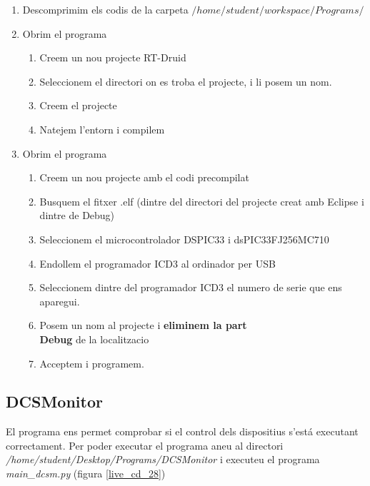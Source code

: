 \begin{enumerate}
	\item Descomprimim els codis de la carpeta $/home/student/workspace/Programs/$
	\item Obrim el programa \Eclipse
	\begin{enumerate}
		\item Creem un nou projecte RT-Druid
		\item Seleccionem el directori on es troba el projecte, i li posem un nom.
		\item Creem el projecte
		\item Natejem l'entorn i compilem
	\end{enumerate}
	\item Obrim el programa \MplabX
	\begin{enumerate}
		\item Creem un nou projecte amb el codi precompilat
		\item Busquem el fitxer .elf (dintre del directori del projecte creat amb Eclipse i dintre de Debug)
		\item Seleccionem el microcontrolador DSPIC33 i dsPIC33FJ256MC710
		\item Endollem el programador ICD3 al ordinador per USB
		\item Seleccionem dintre del programador ICD3 el numero de serie que ens aparegui.
		\item Posem un nom al projecte i \textbf{eliminem la part \\Debug} de la localitzacio
		\item Acceptem i programem.
	\end{enumerate}
\end{enumerate}

\subsection{DCSMonitor}\label{cap:gui:cd:dcsmonitor}

El programa \DCSMonitor ens permet comprobar si el control dels dispositius s'está executant correctament. Per poder executar el programa aneu al directori \emph{/home/student/Desktop/Programs/DCSMonitor} i executeu el programa \emph{main\_dcsm.py} (figura \ref{live_cd_28})

